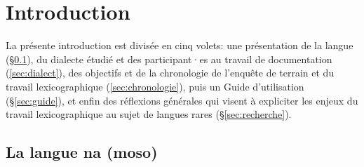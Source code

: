 
\languefra

\chapter*{Introduction}

La présente introduction est divisée en cinq volets: une présentation de la langue (§\ref{sec:lang}), du dialecte étudié et des participant·es au travail de documentation (\ref{sec:dialect}), des objectifs et de la chronologie de l'enquête de terrain et du travail lexicographique
(\ref{sec:chronologie}), puis un Guide d'utilisation (§\ref{sec:guide}), et enfin des réflexions générales qui visent à expliciter les enjeux du travail lexicographique au sujet de langues rares (§\ref{sec:recherche}).


\section{La langue na (moso)}
\label{sec:lang}

